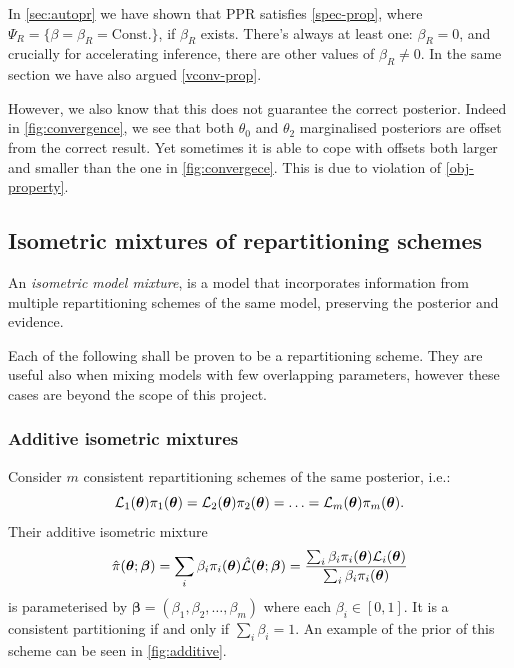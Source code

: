 \documentclass[usenatbib]{mnras}
\begin{document}
In \cref{sec:autopr} we have shown that PPR satisfies
\cref{spec-prop}, where
$\Psi_{R} = \{ \beta = \beta_{R} = \text{Const.}\}$, if $\beta_{R}$
exists. There's always at least one: $\beta_{R}=0$, and crucially for
accelerating inference, there are other values of $\beta_{R}\ne 0$. In
the same section we have also argued \cref{vconv-prop}.

However, we also know that this does not guarantee the correct
posterior. Indeed in \cref{fig:convergence}, we see that both
$\theta_{0}$ and $\theta_{2}$ marginalised posteriors are offset from
the correct result. Yet sometimes it is able to cope with offsets both
larger and smaller than the one in \cref{fig:convergece}. This is due
to violation of \cref{obj-property}.




\subsection{Isometric mixtures of repartitioning schemes}
An \emph{isometric model mixture}, is a model that incorporates
information from multiple repartitioning schemes of the same model,
preserving the posterior and evidence.

Each of the following shall be proven to be a repartitioning
scheme. They are useful also when mixing models with few overlapping
parameters, however these cases are beyond the scope of this project.
\subsubsection{Additive isometric mixtures}\label{sec:org418133f}
Consider \(m\) consistent repartitioning schemes of the same
posterior, i.e.:
\begin{equation}
  \label{eq:collection-of-models}
  {\cal L}_{1}(\bm{\theta}) \pi_{1}(\bm{\theta}) = {\cal L}_{2}(\bm{\theta}) \pi_{2}(\bm{\theta})= \ldots ={\cal L}_{m}(\bm{\theta}) \pi_{m}(\bm{\theta}). 
\end{equation}
Their additive isometric mixture
\begin{subequations}
  \begin{align}
    \hat{\pi}(\bm{\theta}; \bm{\beta}) = \sum_{i} \beta_{i} \pi_{i}(\bm{\theta})\label{eq:additive-mix}
    \hat{{\cal L}}(\bm{\theta}; \bm{\beta}) = \frac{\sum_{i}   \beta_{i} \pi_{i}(\bm{\theta}) {\cal L}_{i}(\bm{\theta})}{\sum_{i} \beta_{i} \pi_{i}(\bm{\theta})}
  \end{align}
\end{subequations}
is parameterised by
$\bm{\beta} = (\beta_{1}, \beta_{2}, \ldots, \beta_{m})$ where each
$\beta_{i} \in [0,1]$. It is a consistent partitioning if and only if
$\sum_{i} \beta_{i} = 1$. An example of the prior of this scheme can
be seen in \cref{fig:additive}.
\end{document}
